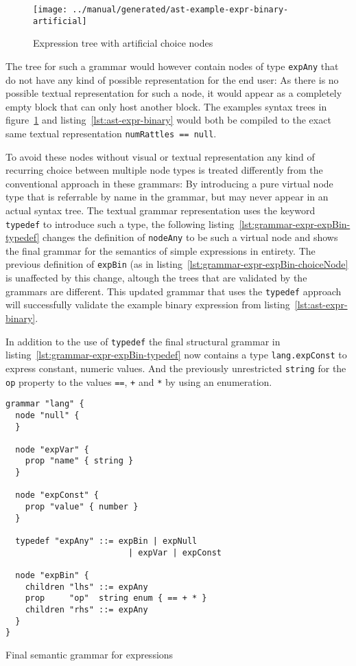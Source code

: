 \documentclass[sigconf,natbib=false,review=true]{acmart}
\newcommand\astScale{0.75}
\begin{document}
\begin{figure}
  \texttt{[image: ../manual/generated/ast-example-expr-binary-artificial]}
  \caption{Expression tree with artificial choice nodes}
  \label{fig:ast-choice-node}
\end{figure}

The tree for such a grammar would however contain nodes of type \texttt{expAny} that do not have any kind of possible representation for the end user: As there is no possible textual representation for such a node, it would appear as a completely empty block that can only host another block. The examples syntax trees in  figure~\ref{fig:ast-choice-node} and listing~\ref{lst:ast-expr-binary} would both be compiled to the exact same textual representation \texttt{numRattles == null}.

To avoid these nodes without visual or textual representation any kind of recurring choice between multiple node types is treated differently from the conventional approach in these grammars: By introducing a pure virtual node type that is referrable by name in the grammar, but may never appear in an actual syntax tree. The textual grammar representation uses the keyword \texttt{typedef} to introduce such a type, the following listing~\ref{lst:grammar-expr-expBin-typedef} changes the definition of \texttt{nodeAny} to be such a virtual node and shows the final grammar for the semantics of simple expressions in entirety. The previous definition of \texttt{expBin} (as in listing~\ref{lst:grammar-expr-expBin-choiceNode} is unaffected by this change, altough the trees that are validated by the grammars are different. This updated grammar that uses the \texttt{typedef} approach will successfully validate the example binary expression from listing~\ref{lst:ast-expr-binary}.

In addition to the use of \texttt{typedef} the final structural grammar in listing~\ref{lst:grammar-expr-expBin-typedef} now contains a type \texttt{lang.expConst} to express constant, numeric values. And the previously unrestricted \texttt{string} for the \texttt{op} property to the values \texttt{==}, \texttt{+} and \texttt{*} by using an enumeration.

\begin{listing}[H]
\begin{verbatim}
grammar "lang" {
  node "null" {
  }

  node "expVar" {
    prop "name" { string }
  }

  node "expConst" {
    prop "value" { number }
  }

  typedef "expAny" ::= expBin | expNull
                         | expVar | expConst

  node "expBin" {
    children "lhs" ::= expAny
    prop     "op"  string enum { == + * }
    children "rhs" ::= expAny
  }
}
\end{verbatim}

\caption{Final semantic grammar for expressions}
\label{lst:grammar-expr-expBin-typedef}
\end{listing}
\end{document}
